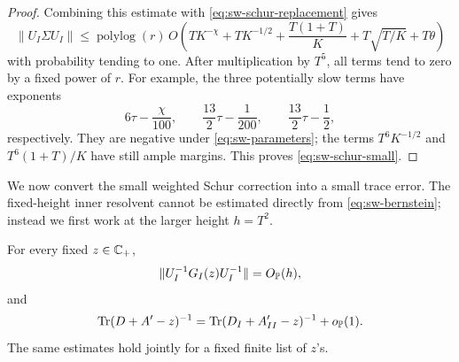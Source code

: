 \begin{proof}
Combining this estimate with \eqref{eq:sw-schur-replacement} gives
\[
 \|U_I\Sigma U_I\|
 \le \operatorname{polylog}(r)\,O\left(
 TK^{-\chi}+TK^{-1/2}+\frac{T(1+T)}K
       +T\sqrt{T/K}+T\theta\right)
\]
with probability tending to one. After multiplication by \(T^5\), all
terms tend to zero by a fixed power of \(r\). For example, the three
potentially slow terms have exponents
\[
 6\tau-\frac{\chi}{100},\qquad
 \frac{13}{2}\tau-\frac1{200},\qquad
 \frac{13}{2}\tau-\frac12,
\]
respectively. They are negative under \eqref{eq:sw-parameters}; the terms
\(T^6K^{-1/2}\) and \(T^6(1+T)/K\) have still ample margins.
This proves \eqref{eq:sw-schur-small}.
\end{proof}

We now convert the small weighted Schur correction into a small trace
error. The fixed-height inner resolvent cannot be estimated directly from
\eqref{eq:sw-bernstein}; instead we first work at the larger height \(h=T^2\).

\begin{lemma}\label{sw:trace-cut}
For every fixed \(z\in\mathbb C_+\),
\begin{equation}\label{eq:sw-inner-resolvent}
 \|U_I^{-1}G_I(z)U_I^{-1}\|=O_{\mathbb P}(h),
\end{equation}
and
\begin{equation}\label{eq:sw-second-cut}
 \operatorname{Tr}(D+A'-z)^{-1}
 =\operatorname{Tr}(D_I+A'_{II}-z)^{-1}+o_{\mathbb P}(1).
\end{equation}
The same estimates hold jointly for a fixed finite list of \(z\)'s.
\end{lemma}

